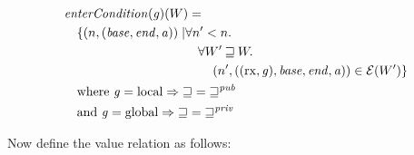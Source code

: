 \documentclass[a4paper]{article}
\newcommand{\var}[1]{\mathit{#1}}
\newcommand{\gl}{\var{g}}
\newcommand{\addr}{\var{a}}
\newcommand{\start}{\var{base}}
\newcommand{\addrend}{\var{end}}
\newcommand{\plainfun}[2]{
  \ifthenelse{\equal{#2}{}}
  {\mathit{#1}}
  {\mathit{#1}(#2)}
}
\newcommand{\entryCond}[1]{\plainfun{enterCondition}{#1}}
\newcommand{\future}{\mathbin{\sqsupseteq}}
\newcommand{\futurewk}{\mathbin{\sqsupseteq}^{\var{pub}}}
\newcommand{\futurestr}{\mathbin{\sqsupseteq}^{\var{priv}}}
\newcommand{\asmType}{\plaindom{AsmType}}
\newcommand{\plaindom}[1]{\mathrm{#1}}
\newcommand{\intr}[2]{\mathcal{#1}}
\newcommand{\exprintr}[1]{\intr{E}{#1}}
\newcommand{\stder}{\exprintr{\asmType}}
\newcommand{\npair}[2][n]{\left(#1,#2 \right)}
\newcommand{\plainperm}[1]{\mathrm{#1}}
\newcommand{\exec}{\plainperm{rx}}
\newcommand{\local}{\plainperm{local}}
\newcommand{\glob}{\plainperm{global}}
\begin{document}
\begin{align*}
  & \entryCond{}(\gl)(W) = \\
  & \quad
    \begin{aligned}[t]
      \{ \npair{(\start,\addrend,\addr)} \mid &  \forall n' < n \ldotp\\
      & \quad \forall W' \future W \ldotp\\
      & \qquad \npair[n']{((\exec,\gl),\start,\addrend,\addr)} \in \stder(W')\}
    \end{aligned} \\
  & \quad \text{where } \gl = \local \Rightarrow \future = \futurewk \\
  & \quad \text{and } \gl = \glob \Rightarrow \future = \futurestr
\end{align*}

Now define the value relation as follows:
\end{document}
